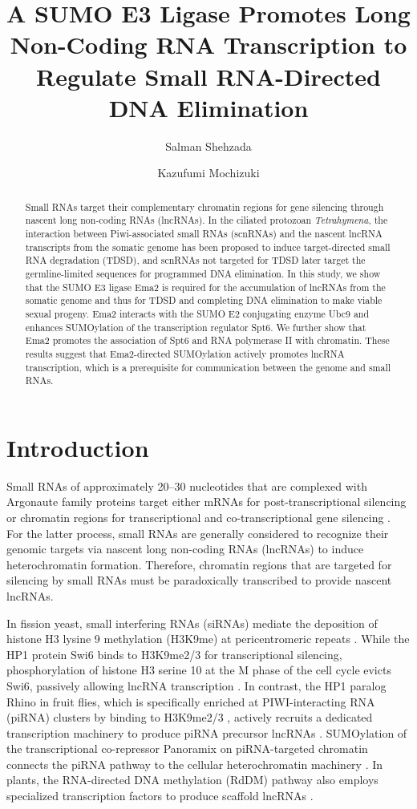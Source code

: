 \documentclass[11pt]{article}
\title{A SUMO E3 Ligase Promotes Long Non-Coding RNA Transcription to Regulate Small RNA-Directed DNA Elimination}
\author[1]{Salman Shehzada}
\author[1]{Kazufumi Mochizuki}
\affil[1]{Institute of Human Genetics, University of Montpellier, CNRS, Montpellier, France}
\date{}
\begin{document}
\maketitle

\begin{abstract}
Small RNAs target their complementary chromatin regions for gene silencing through nascent long non-coding RNAs (lncRNAs). In the ciliated protozoan \textit{Tetrahymena}, the interaction between Piwi-associated small RNAs (scnRNAs) and the nascent lncRNA transcripts from the somatic genome has been proposed to induce target-directed small RNA degradation (TDSD), and scnRNAs not targeted for TDSD later target the germline-limited sequences for programmed DNA elimination. In this study, we show that the SUMO E3 ligase Ema2 is required for the accumulation of lncRNAs from the somatic genome and thus for TDSD and completing DNA elimination to make viable sexual progeny. Ema2 interacts with the SUMO E2 conjugating enzyme Ubc9 and enhances SUMOylation of the transcription regulator Spt6. We further show that Ema2 promotes the association of Spt6 and RNA polymerase II with chromatin. These results suggest that Ema2-directed SUMOylation actively promotes lncRNA transcription, which is a prerequisite for communication between the genome and small RNAs.
\end{abstract}

\section{Introduction}

Small RNAs of approximately 20--30 nucleotides that are complexed with Argonaute family proteins target either mRNAs for post-transcriptional silencing or chromatin regions for transcriptional and co-transcriptional gene silencing \citep{volpe2002,verdel2004,sienski2012}. For the latter process, small RNAs are generally considered to recognize their genomic targets via nascent long non-coding RNAs (lncRNAs) to induce heterochromatin formation. Therefore, chromatin regions that are targeted for silencing by small RNAs must be paradoxically transcribed to provide nascent lncRNAs.

In fission yeast, small interfering RNAs (siRNAs) mediate the deposition of histone H3 lysine 9 methylation (H3K9me) at pericentromeric repeats \citep{volpe2002,verdel2004}. While the HP1 protein Swi6 binds to H3K9me2/3 for transcriptional silencing, phosphorylation of histone H3 serine 10 at the M phase of the cell cycle evicts Swi6, passively allowing lncRNA transcription \citep{zhang2008,kloc2008}. In contrast, the HP1 paralog Rhino in fruit flies, which is specifically enriched at PIWI-interacting RNA (piRNA) clusters by binding to H3K9me2/3 \citep{lethomas2014}, actively recruits a dedicated transcription machinery to produce piRNA precursor lncRNAs \citep{klattenhoff2009,andersen2017}. SUMOylation of the transcriptional co-repressor Panoramix on piRNA-targeted chromatin connects the piRNA pathway to the cellular heterochromatin machinery \citep{batki2022}. In plants, the RNA-directed DNA methylation (RdDM) pathway also employs specialized transcription factors to produce scaffold lncRNAs \citep{law2011,law2013}.
\end{document}
